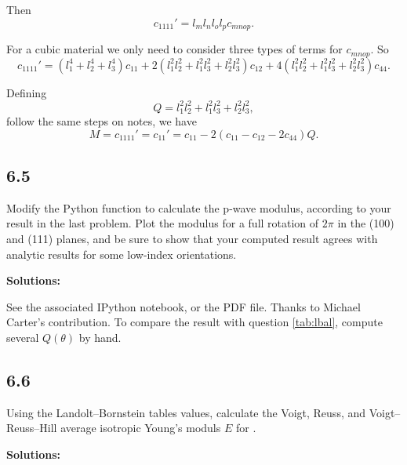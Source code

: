 \documentclass[12pt]{article}
\begin{document}
Then
\begin{equation}
  c_{1111}' = l_{m} l_{n} l_{o} l_{p} c_{mnop}.
\end{equation}

For a cubic material we only need to consider three types of terms for $c_{mnop}$.
So
\begin{equation}
  c_{1111}' = (l_1^4 + l_2^4 + l_3^4) c_{11} + 2(l_1^2 l_2^2 + l_1^2 l_3^2 + l_2^2 l_3^2) c_{12} + 4(l_1^2 l_2^2 + l_1^2 l_3^2 + l_2^2 l_3^2) c_{44}.
\end{equation}

Defining
\begin{equation}
  Q = l_1^2 l_2^2 + l_1^2 l_3^2 + l_2^2 l_3^2,
\end{equation}
follow the same steps on notes, we have
\begin{equation}
  M = c_{1111}' = c_{11}' = c_{11} - 2(c_{11} - c_{12} - 2 c_{44}) Q.
\end{equation}


\subsection{6.5}
Modify the Python function to calculate the p-wave modulus,
according to your result in the last problem.  Plot the modulus for a
full rotation of $2\pi$ in the \hkl(100) and \hkl(111) planes, and be sure to show that
your computed result agrees with analytic results for some low-index orientations.

\textbf{Solutions:}

See the associated IPython notebook, or the PDF file. Thanks to Michael Carter's contribution.
To compare the result with question \ref{tab:lbal}, compute several $Q(\theta)$ by hand.

\subsection{6.6}
Using the Landolt--Bornstein tables values, calculate the Voigt, Reuss,
and Voigt--Reuss--Hill average isotropic Young's moduls $E$ for .

\textbf{Solutions:}
\end{document}
